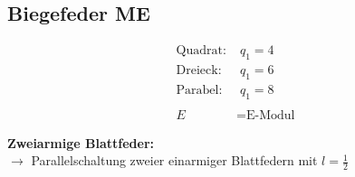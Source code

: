 \subsection{Biegefeder \hfill ME}
\vspace*{-1em}
\begin{footnotesize}
    \begin{center}
        \begin{minipage}{0.5\linewidth}
        \end{minipage}
        \begin{minipage}{0.48\linewidth}
            \begin{scriptsize}
                \begin{align*}
                    \text{Quadrat:}& \; q_1 = 4
                    \\\text{Dreieck:}& \; q_1 = 6
                    \\\text{Parabel:}& \; q_1 = 8
                    \\~\\ E &= \text{E-Modul}
                \end{align*}
            \end{scriptsize}
        \end{minipage}
    \end{center}
    \scriptsize{\textbf{Zweiarmige Blattfeder:} \\$\to$ Parallelschaltung zweier einarmiger Blattfedern mit $l = \frac{1}{2}$}
\end{footnotesize}
\vspace*{-0.5em}